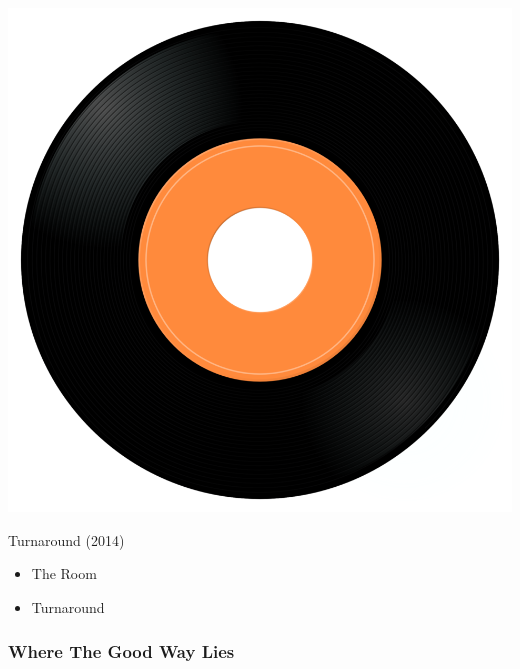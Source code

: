 \begin{minipage}[t]{0.25\textwidth}
\captionsetup{type=figure}
\includegraphics[width=\textwidth]{Images/cover.png}
\caption*{Turnaround (2014)}
\end{minipage}
\begin{minipage}[t]{0.25\textwidth}\vspace{0pt}
\begin{itemize}[nosep,leftmargin=1em,labelwidth=*,align=left]
	\setlength{\itemsep}{0pt}
	\item The Room
	\item Turnaround
\end{itemize}
\end{minipage}

\subsubsection{Where The Good Way Lies}

